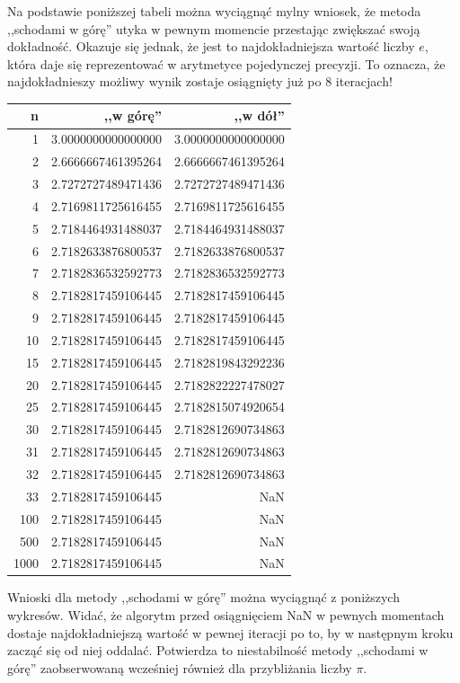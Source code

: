 \documentclass[11pt,leqno]{article}
\begin{document}
Na podstawie poniższej tabeli można wyciągnąć mylny wniosek, że metoda ,,schodami w górę'' utyka w pewnym momencie przestając zwiększać swoją dokładność. Okazuje się jednak, że jest to najdokładniejsza wartość liczby $e$, która daje się reprezentować w arytmetyce pojedynczej precyzji. To oznacza, że najdokładnieszy możliwy wynik zostaje osiągnięty już po 8 iteracjach!

\begin{center}
\begin{tabular}{ r || r | r }
  \hline
  n & ,,w górę'' & ,,w dół''\\
  \hline \hline
  1 & 3.0000000000000000 & 3.0000000000000000 \\
  2 & 2.6666667461395264 & 2.6666667461395264 \\
  3 & 2.7272727489471436 & 2.7272727489471436 \\
  4 & 2.7169811725616455 & 2.7169811725616455 \\
  5 & 2.7184464931488037 & 2.7184464931488037 \\
  6 & 2.7182633876800537 & 2.7182633876800537 \\
  7 & 2.7182836532592773 & 2.7182836532592773 \\
  8 & 2.7182817459106445 & 2.7182817459106445 \\
  9 & 2.7182817459106445 & 2.7182817459106445 \\
  10 & 2.7182817459106445 & 2.7182817459106445 \\
  15 & 2.7182817459106445 & 2.7182819843292236 \\
  20 & 2.7182817459106445 & 2.7182822227478027 \\
  25 & 2.7182817459106445 & 2.7182815074920654 \\
  30 & 2.7182817459106445 & 2.7182812690734863 \\
  31 & 2.7182817459106445 & 2.7182812690734863 \\
  32 & 2.7182817459106445 & 2.7182812690734863 \\
  33 & 2.7182817459106445 & NaN \\
  100 & 2.7182817459106445 & NaN \\
  500 & 2.7182817459106445 & NaN \\
  1000 & 2.7182817459106445 & NaN \\
\end{tabular}
\end{center}

Wnioski dla metody ,,schodami w górę'' można wyciągnąć z poniższych wykresów. Widać, że algorytm przed osiągnięciem NaN w pewnych momentach dostaje najdokładniejszą wartość w pewnej iteracji po to, by w następnym kroku zacząć się od niej oddalać. Potwierdza to niestabilność metody ,,schodami w górę'' zaobserwowaną wcześniej również dla przybliżania liczby $\pi$. 
\end{document}

